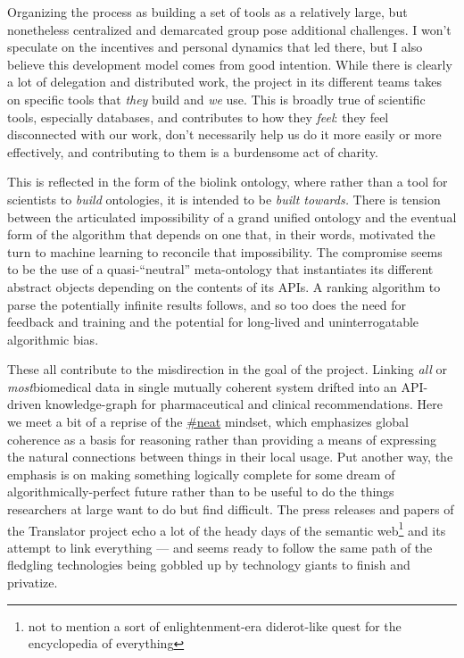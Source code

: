 \documentclass[11pt]{article}
\begin{document}
\begin{multicols}{2}
Organizing the process as building a set of tools as a relatively large,
but nonetheless centralized and demarcated group pose additional
challenges. I won't speculate on the incentives and personal dynamics
that led there, but I also believe this development model comes from
good intention. While there is clearly a lot of delegation and
distributed work, the project in its different teams takes on specific
tools that \emph{they} build and \emph{we} use. This is broadly true of
scientific tools, especially databases, and contributes to how they
\emph{feel}: they feel disconnected with our work, don't necessarily
help us do it more easily or more effectively, and contributing to them
is a burdensome act of charity.

This is reflected in the form of the biolink ontology, where rather than
a tool for scientists to \emph{build} ontologies, it is intended to be
\emph{built towards.} There is tension between the articulated
impossibility of a grand unified ontology and the eventual form of the
algorithm that depends on one that, in their words, motivated the turn
to machine learning to reconcile that impossibility. The compromise
seems to be the use of a quasi-``neutral'' meta-ontology that
instantiates its different abstract objects depending on the contents of
its APIs. A ranking algorithm to parse the potentially infinite results
follows, and so too does the need for feedback and training and the
potential for long-lived and uninterrogatable algorithmic bias.

These all contribute to the misdirection in the goal of the project.
Linking \emph{all} or \emph{most}biomedical data in single mutually
coherent system drifted into an API-driven knowledge-graph for
pharmaceutical and clinical recommendations. Here we meet a bit of a
reprise of the \protect\hyperlink{neatness-vs-scruffiness}{\#neat}
mindset, which emphasizes global coherence as a basis for reasoning
rather than providing a means of expressing the natural connections
between things in their local usage. Put another way, the emphasis is on
making something logically complete for some dream of
algorithmically-perfect future rather than to be useful to do the things
researchers at large want to do but find difficult. The press releases
and papers of the Translator project echo a lot of the heady days of the
semantic web\footnote{not to mention a sort of enlightenment-era
  diderot-like quest for the encyclopedia of everything} and its attempt
to link everything --- and seems ready to follow the same path of the
fledgling technologies being gobbled up by technology giants to finish
and privatize.


\end{multicols}
\end{document}
